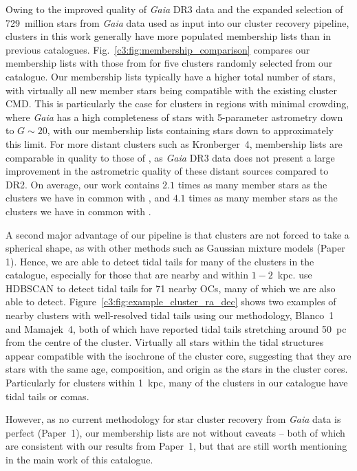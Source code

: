 Owing to the improved quality of \emph{Gaia} DR3 data and the expanded selection of 729~million stars from \emph{Gaia} data used as input into our cluster recovery pipeline, clusters in this work generally have more populated membership lists than in previous catalogues. Fig.~\ref{c3:fig:membership_comparison} compares our membership lists with those from \cite{cantat-gaudin_clusters_2020} for five clusters randomly selected from our catalogue. Our membership lists typically have a higher total number of stars, with virtually all new member stars being compatible with the existing cluster CMD. This is particularly the case for clusters in regions with minimal crowding, where \emph{Gaia} has a high completeness of stars with 5-parameter astrometry down to $G\sim20$, with our membership lists containing stars down to approximately this limit. For more distant clusters such as Kronberger~4, membership lists are comparable in quality to those of \cite{cantat-gaudin_clusters_2020}, as \emph{Gaia} DR3 data does not present a large improvement in the astrometric quality of these distant sources compared to DR2. On average, our work contains $2.1$ times as many member stars as the clusters we have in common with \cite{cantat-gaudin_clusters_2020}, and $4.1$ times as many member stars as the clusters we have in common with \cite{kharchenko_global_2013}.

A second major advantage of our pipeline is that clusters are not forced to take a spherical shape, as with other methods such as Gaussian mixture models (Paper 1). Hence, we are able to detect tidal tails for many of the clusters in the catalogue, especially for those that are nearby and within $1-2$~kpc. \cite{tarricq_structural_2022} use HDBSCAN to detect tidal tails for 71 nearby OCs, many of which we are also able to detect. Figure~\ref{c3:fig:example_cluster_ra_dec} shows two examples of nearby clusters with well-resolved tidal tails using our methodology, Blanco~1 and Mamajek~4, both of which have reported tidal tails stretching around 50~pc from the centre of the cluster. Virtually all stars within the tidal structures appear compatible with the isochrone of the cluster core, suggesting that they are stars with the same age, composition, and origin as the stars in the cluster cores. Particularly for clusters within 1~kpc, many of the clusters in our catalogue have tidal tails or comas.

However, as no current methodology for star cluster recovery from \emph{Gaia} data is perfect (Paper~1), our membership lists are not without caveats -- both of which are consistent with our results from Paper~1, but that are still worth mentioning in the main work of this catalogue. 

